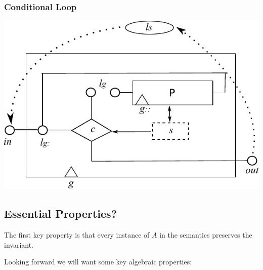 \subsubsection{Conditional Loop}



\includegraphics{images/iteration-actual}

\newpage
\subsection{Essential Properties?}

The first key property is that every instance of $A$
in the semantics preserves the invariant.

Looking forward we will want some key algebraic properties:


